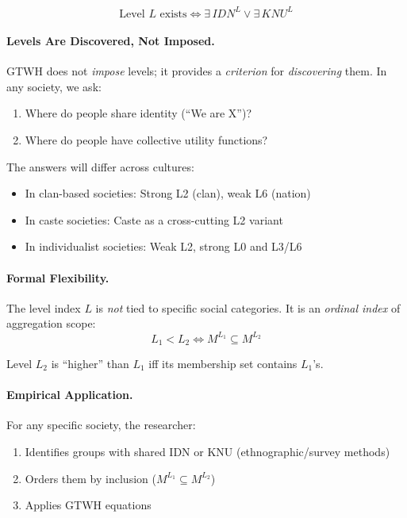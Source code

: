 \documentclass[12pt,a4paper]{article}
\begin{document}
\begin{equation}
\text{Level } L \text{ exists} \iff \exists \, IDN^L \lor \exists \, KNU^L
\end{equation}

\paragraph{Levels Are Discovered, Not Imposed.}

GTWH does not \textit{impose} levels; it provides a \textit{criterion} for 
\textit{discovering} them. In any society, we ask:
\begin{enumerate}[nosep]
\item Where do people share identity (``We are X'')?
\item Where do people have collective utility functions?
\end{enumerate}

The answers will differ across cultures:
\begin{itemize}[nosep]
\item In clan-based societies: Strong L2 (clan), weak L6 (nation)
\item In caste societies: Caste as a cross-cutting L2 variant
\item In individualist societies: Weak L2, strong L0 and L3/L6
\end{itemize}

\paragraph{Formal Flexibility.}

The level index $L$ is \textit{not} tied to specific social categories. 
It is an \textit{ordinal index} of aggregation scope:
\begin{equation}
L_1 < L_2 \iff M^{L_1} \subseteq M^{L_2}
\end{equation}

Level $L_2$ is ``higher'' than $L_1$ iff its membership set contains $L_1$'s.

\paragraph{Empirical Application.}

For any specific society, the researcher:
\begin{enumerate}[nosep]
\item Identifies groups with shared IDN or KNU (ethnographic/survey methods)
\item Orders them by inclusion ($M^{L_1} \subseteq M^{L_2}$)
\item Applies GTWH equations
\end{enumerate}
\end{document}
